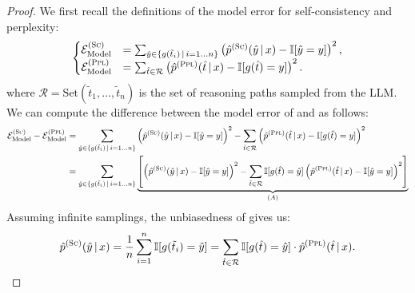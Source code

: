 \begin{proof}
    We first recall the definitions of the model error for self-consistency and perplexity:
    \begin{equation}
        \begin{cases}
            \mathcal{E}_{\text{Model}}^{(\textsc{Sc})} &= \sum_{\hat{y} \in \{g(\tilde{t}_i) \, | \, i = 1 \ldots n \}} \left ( \hat{p}^{(\textsc{Sc})}(\hat{y} \,|\, x) - \mathbb{I}[\hat{y} = y] \right )^2, \\
            \mathcal{E}_{\text{Model}}^{(\textsc{Ppl})} &= \sum_{\hat{t}\in\mathcal{R}} \left ( \hat{p}^{(\textsc{Ppl})}(\hat{t} \,|\, x) - \mathbb{I}[g(\hat{t}) = y] \right )^2.             
        \end{cases}
    \end{equation}
    where $\mathcal{R} = \text{Set}(\tilde{t}_1, \ldots, \tilde{t}_n)$ is the set of reasoning paths sampled from the LLM.
    We can compute the difference between the model error of \SC and \PP as follows:
    \begin{equation}
        \begin{aligned}
            \mathcal{E}_{\text{Model}}^{(\textsc{Sc})} - \mathcal{E}_{\text{Model}}^{(\textsc{Ppl})}
            &=  \sum_{\hat{y} \in \{g(\tilde{t}_i) \, | \, i = 1 \ldots n \}} \left ( \hat{p}^{(\textsc{Sc})}(\hat{y} \,|\, x) - \mathbb{I}[\hat{y} = y] \right )^2 
             - \sum_{\hat{t}\in\mathcal{R}} \left ( \hat{p}^{(\textsc{Ppl})}(\hat{t} \,|\, x) - \mathbb{I}[g(\hat{t}) = y] \right )^2 \\            
            &= \sum_{\hat{y} \in \{g(\hat{t}_i) \, | \, i = 1 \ldots n \}} 
            \underbrace{\left [ \left ( \hat{p}^{(\textsc{Sc})}(\hat{y} \,|\, x) - \mathbb{I}[\hat{y} = y] \right )^2 - \sum_{\hat{t} \in \mathcal{R}} \mathbb{I}[g(\hat{t}) = \hat{y}] \left ( \hat{p}^{(\textsc{Ppl})}(\hat{t} \,|\, x) - \mathbb{I}[\hat{y} = y] \right )^2 \right ]}_{(A)} \\
        \end{aligned}
    \end{equation}
    Assuming infinite samplings, the unbiasedness of \SC gives us: 
    \begin{equation}
        \begin{aligned}
            \hat{p}^{(\SC)}(\hat{y} \,|\, x) 
            = \frac{1}{n} \sum_{i=1}^n \mathbb{I}[g(\tilde{t}_i) = \hat{y}] 
             = \sum_{\hat{t} \in \mathcal{R}} \mathbb{I}[g(\hat{t}) = \hat{y}] \cdot \hat{p}^{(\PP)}(\hat{t} \,|\, x).

\end{aligned}
\end{equation}
\end{proof}
